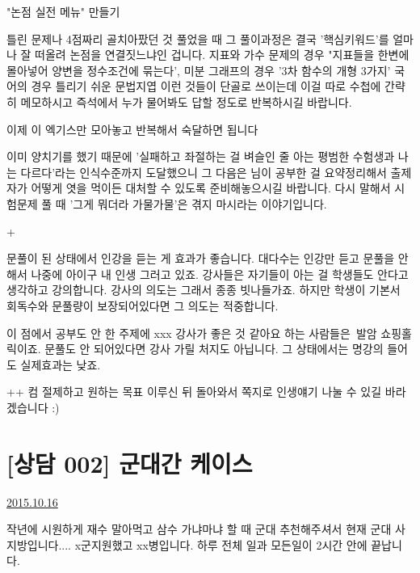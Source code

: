 "논점 실전 메뉴" 만들기
\vspace{5mm}

틀린 문제나 4점짜리 골치아팠던 것 풀었을 때 그 풀이과정은 결국 '핵심키워드'를 얼마나 잘 떠올려 논점을 연결짓느냐인 겁니다.
지표와 가수 문제의 경우 "지표들을 한변에 몰아넣어 양변을 정수조건에 묶는다',
미분 그래프의 경우 '3차 함수의 개형 3가지'
국어의 경우 틀리기 쉬운 문법지엽
이런 것들이 단골로 쓰이는데 이걸 따로 수첩에 간략히 메모하시고 즉석에서 누가 물어봐도 답할 정도로 반복하시길 바랍니다.
\vspace{5mm}

이제 이 엑기스만 모아놓고 반복해서 숙달하면 됩니다
\vspace{5mm}

이미 양치기를 했기 때문에 '실패하고 좌절하는 걸 벼슬인 줄 아는 평범한 수험생과 나는 다르다'라는 인식수준까지 도달했으니
그 다음은 님이 공부한 걸 요약정리해서 출제자가 어떻게 엿을 먹이든 대처할 수 있도록 준비해놓으시길 바랍니다.
다시 말해서 시험문제 풀 때 '그게 뭐더라 가물가물'은 겪지 마시라는 이야기입니다.
\vspace{5mm}

+
\vspace{5mm}

문풀이 된 상태에서 인강을 듣는 게 효과가 좋습니다. 대다수는 인강만 듣고 문풀을 안 해서 나중에 아이구 내 인생 그러고 있죠.
강사들은 자기들이 아는 걸 학생들도 안다고 생각하고 강의합니다. 강사의 의도는 그래서 종종 빗나들가죠.
하지만 학생이 기본서 회독수와 문풀량이 보장되어있다면 그 의도는 적중합니다.
\vspace{5mm}

이 점에서 공부도 안 한 주제에 xxx 강사가 좋은 것 같아요 하는 사람들은 발암 쇼핑홀릭이죠.
문풀도 안 되어있다면 강사 가릴 처지도 아닙니다. 그 상태에서는 명강의 들어도 실제효과는 낮죠.
\vspace{5mm}

++
컴 절제하고 원하는 목표 이루신 뒤 돌아와서 쪽지로 인생얘기 나눌 수 있길 바라겠습니다 :)
\vspace{5mm}




\section{[상담 002] 군대간 케이스}
\href{https://www.kockoc.com/Apoc/418933}{2015.10.16}

\vspace{5mm}

    
    작년에 시원하게 재수 말아먹고 삼수 가냐마냐 할 때 군대 추천해주셔서 현재 군대 사지방입니다....
    x군지원했고 xx병입니다. 하루 전체 일과 모든일이 2시간 안에 끝납니다.
    \vspace{5mm}

